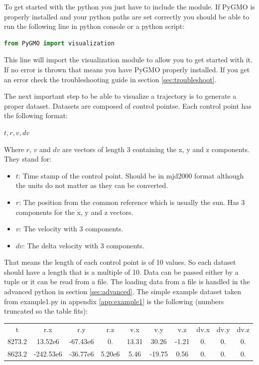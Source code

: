 \documentclass[a4paper,11pt]{article}
\begin{document}
To get started with the python you just have to include the module. If PyGMO is properly installed and your python paths are set correctly you should be able to run the following line in python console or a python script:
\begin{lstlisting}[language=Python,breakatwhitespace=true]
from PyGMO import visualization
\end{lstlisting}
This line will import the visualization module to allow you to get started with it. If no error is thrown that means you have PyGMO properly installed. If you get an error check the troubleshooting guide in section \ref{sec:troubleshoot}.

The next important step to be able to visualize a trajectory is to generate a proper dataset. Datasets are composed of control pointse. Each control point has the following format:

$ t, r, v, dv $

Where $r$, $v$ and $dv$ are vectors of length 3 containing the x, y and z components. They stand for:

\begin{itemize}
\item $t$: Time stamp of the control point. Should be in \gls{mjd2000}\cite{mjd2000} format although the units do not matter as they can be converted.
\item $r$: The position from the common reference which is usually the sun. Has 3 components for the x, y and z vectors.
\item $v$: The velocity with 3 components.
\item $dv$: The delta velocity with 3 components.
\end{itemize}

That means the length of each control point is of 10 values. So each dataset should have a length that is a multiple of 10. Data can be passed either by a tuple or it can be read from a file. The loading data from a file is handled in the advanced \gls{python} in section \ref{sec:advanced}. The simple example dataset taken from example1.py in appendix \ref{app:example1} is the following (numbers truncated so the table fits):

\begin{tabular}{|c|c|c|c|c|c|c|c|c|c|}
   t & r.x & r.y & r.z & v.x & v.y & v.z & dv.x & dv.y & dv.z \\
   8273.2 & 13.52e6 & -67.43e6 & 0. & 13.31 & 30.26 & -1.21 & 0. & 0. & 0. \\
   8623.2 & -242.53e6 & -36.77e6 & 5.20e6 & 5.46 & -19.75 & 0.56 & 0. & 0. & 0. \\
\end{tabular}
\end{document}
